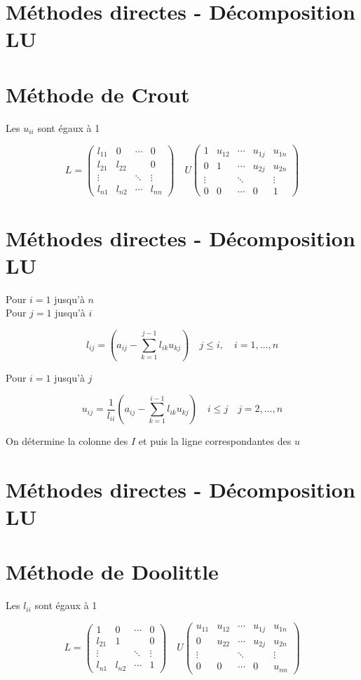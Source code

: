 \documentclass[10pt]{article}
\begin{document}
\section*{Méthodes directes - Décomposition LU}
\section*{Méthode de Crout}
Les \(u_{i i}\) sont égaux à 1

\[
L=\left(\begin{array}{cccc}
l_{11} & 0 & \cdots & 0 \\
l_{21} & l_{22} & & 0 \\
\vdots & & \ddots & \vdots \\
l_{n 1} & l_{n 2} & \cdots & l_{n n}
\end{array}\right) \quad U\left(\begin{array}{ccccc}
1 & u_{12} & \cdots & u_{1 j} & u_{1 n} \\
0 & 1 & \cdots & u_{2 j} & u_{2 n} \\
\vdots & & \ddots & & \vdots \\
0 & 0 & \cdots & 0 & 1
\end{array}\right)
\]

\section*{Méthodes directes - Décomposition LU}
Pour \(i=1\) jusqu'à \(n\)\\
Pour \(j=1\) jusqu'à \(i\)

\[
l_{i j}=\left(a_{i j}-\sum_{k=1}^{j-1} l_{i k} u_{k j}\right) \quad j \leq i, \quad i=1, \ldots, n
\]

Pour \(i=1\) jusqu'à \(j\)

\[
u_{i j}=\frac{1}{l_{i i}}\left(a_{i j}-\sum_{k=1}^{i-1} l_{i k} u_{k j}\right) \quad i \leq j \quad j=2, \ldots, n
\]

On détermine la colonne des \(I\) et puis la ligne correspondantes des \(u\)

\section*{Méthodes directes - Décomposition LU}
\section*{Méthode de Doolittle}
Les \(l_{i i}\) sont égaux à 1

\[
L=\left(\begin{array}{cccc}
1 & 0 & \cdots & 0 \\
l_{21} & 1 & & 0 \\
\vdots & & \ddots & \vdots \\
l_{n 1} & l_{n 2} & \cdots & 1
\end{array}\right) \quad U\left(\begin{array}{ccccc}
u_{11} & u_{12} & \cdots & u_{1 j} & u_{1 n} \\
0 & u_{22} & \cdots & u_{2 j} & u_{2 n} \\
\vdots & & \ddots & & \vdots \\
0 & 0 & \cdots & 0 & u_{n n}
\end{array}\right)
\]
\end{document}
